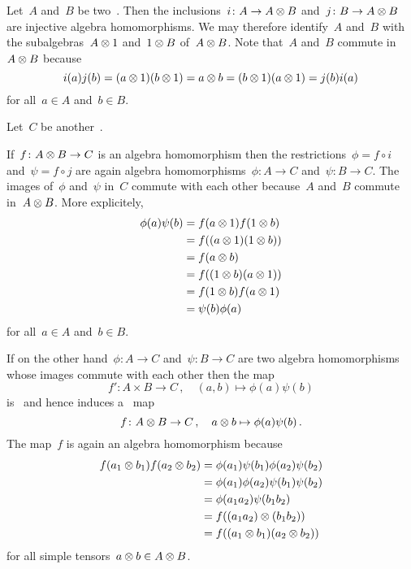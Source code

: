 \begin{recall}
  \label{homomorphism out of a tensor product}
  Let~$A$ and~$B$ be two~{\algebras{$\kf$}}.
  Then the inclusions~$i \colon A \to A \otimes B$ and~$j \colon B \to A \otimes B$ are injective algebra homomorphisms.
  We may therefore identify~$A$ and~$B$ with the subalgebras~$A \otimes 1$ and~$1 \otimes B$ of~$A \otimes B$.
  Note that~$A$ and~$B$ commute in~$A \otimes B$ because
  \[
    i(a) j(b)
    =
    (a \otimes 1) (b \otimes 1)
    =
    a \otimes b
    =
    (b \otimes 1) (a \otimes 1)
    =
    j(b) i(a)
  \]
  for all~$a \in A$ and~$b \in B$.
  
  Let~$C$ be another~{\algebra{$\kf$}}.
  
  If~$f \colon A \otimes B \to C$ is an algebra homomorphism then the restrictions~$\phi = f \circ i$ and~$\psi = f \circ j$ are again algebra homomorphisms~$\phi \colon A \to C$ and~$\psi \colon B \to C$.
  The images of~$\phi$ and~$\psi$ in~$C$ commute with each other because~$A$ and~$B$ commute in~$A \otimes B$.
  More explicitely,
  \begin{align*}
    \phi(a) \psi(b)
    &=
    f(a \otimes 1) f(1 \otimes b)
    \\
    &=
    f((a \otimes 1) (1 \otimes b))
    \\
    &=
    f(a \otimes b)
    \\
    &=
    f((1 \otimes b) (a \otimes 1))
    \\
    &=
    f(1 \otimes b) f(a \otimes 1)
    \\
    &=
    \psi(b) \phi(a)
  \end{align*}
  for all~$a \in A$ and~$b \in B$.
  
  If on the other hand~$\phi \colon A \to C$ and~$\psi \colon B \to C$ are two algebra homomorphisms whose images commute with each other then the map
  \[
    f'
    \colon
    A \times B
    \to
    C \,,
    \quad
    (a,b)
    \mapsto
    \phi(a) \psi(b)
  \]
  is~{\bilinear{$\kf$}} and hence induces a~{\linear{$\kf$}} map
  \[
    f
    \colon
    A \otimes B
    \to
    C \,,
    \quad
    a \otimes b
    \mapsto
    \phi(a) \psi(b) \,.
  \]
  The map~$f$ is again an algebra homomorphism because
  \begin{align*}
    f(a_1 \otimes b_1) f(a_2 \otimes b_2)
    &=
    \phi(a_1) \psi(b_1) \phi(a_2) \psi(b_2)
    \\
    &=
    \phi(a_1) \phi(a_2) \psi(b_1) \psi(b_2)
    \\
    &=
    \phi(a_1 a_2) \psi(b_1 b_2)
    \\
    &=
    f( (a_1 a_2) \otimes (b_1 b_2) )
    \\
    &=
    f( (a_1 \otimes b_1) (a_2 \otimes b_2) )
  \end{align*}
  for all simple tensors~$a \otimes b \in A \otimes B$.
  

\end{recall}

